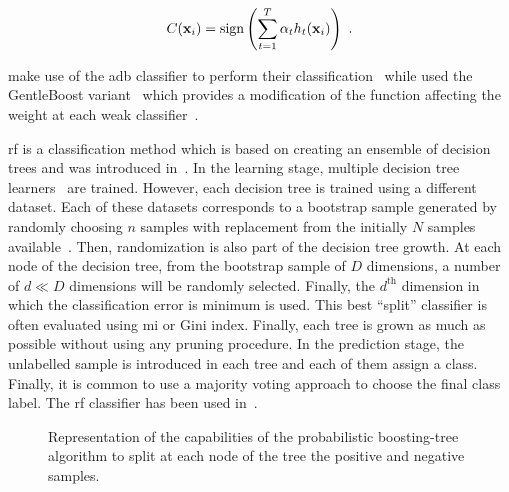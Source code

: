 \begin{equation}
	C(\mathbf{x}_i) = \operatorname*{sign} \left( \sum_{t=1}^{T} \alpha_t h_t(\mathbf{x}_i) \right) \ .
	\label{eq:strclaada}
\end{equation}

\citeauthor{Lopes2011} make use of the \ac{adb} classifier to perform their classification~\cite{Lopes2011} while \citeauthor{Litjens2014} used the GentleBoost variant~\cite{Friedman1998} which provides a modification of the function affecting the weight at each weak classifier~\cite{Litjens2014}.

\Ac{rf} is a classification method which is based on creating an ensemble of decision trees and was introduced in~\cite{Breiman2001}.
In the learning stage, multiple decision tree learners~\cite{Breiman1984} are trained.
However, each decision tree is trained using a different dataset.
Each of these datasets corresponds to a bootstrap sample generated by randomly choosing $n$ samples with replacement from the initially $N$ samples available~\cite{Efron1979}.
Then, randomization is also part of the decision tree growth.
At each node of the decision tree, from the bootstrap sample of $D$ dimensions, a number of $d \ll D$ dimensions will be randomly selected.
Finally, the $d^{\text{th}}$ dimension in which the classification error is minimum is used.
This best ``split'' classifier is often evaluated using \ac{mi} or Gini index.
Finally, each tree is grown as much as possible without using any pruning procedure.
In the prediction stage, the unlabelled sample is introduced in each tree and each of them assign a class.
Finally, it is common to use a majority voting approach to choose the final class label.
The \ac{rf} classifier has been used in~\cite{Kelm2007,Litjens2014,Tiwari2012,Tiwari2013,Viswanath2009,trigui2017automatic,trigui2016classification,samarasinghe2016semi,rampun2015classifying,rampun2016computerb,rampun2015computer,rampun2016computer}.

\begin{figure}
\centering
\caption[Representation of the probabilistic boosting-tree.]{Representation of the capabilities of the probabilistic boosting-tree algorithm to split at each node of the tree the positive and negative samples.}
\label{fig:pbtsim}
\end{figure}

